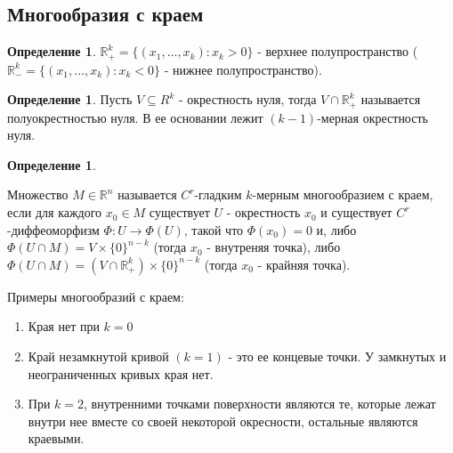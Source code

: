 \documentclass[a5paper]{article}
\newcounter{through}
\theoremstyle{plain}
\theoremstyle{definition}
\newtheorem{definition}[through]{Определение}
\numberwithin{through}{section}
\numberwithin{equation}{section}
\begin{document}
\subsection{Многообразия с краем}

\begin{definition}
	$\mathbb{R}_+^k = \{(x_1, \ldots, x_k) : x_k > 0\}$ - верхнее полупространство ($\mathbb{R}_-^k = \{(x_1, \ldots, x_k) : x_k < 0\}$ - нижнее полупространство).
\end{definition}

\begin{definition}
	Пусть $V \subseteq R^k$ - окрестность нуля, тогда $V \cap \mathbb{R}_+^k$ называется полуокрестностью нуля. В ее основании лежит $(k-1)$-мерная окрестность нуля.
\end{definition}

\begin{definition}
	\label{ManifoldWithBoundary}
	
	Множество $M \in \mathbb{R}^n$ называется $C^r$-гладким $k$-мерным
	многообразием с краем, если для каждого $x_0 \in M$ существует $U$ - окрестность $x_0$ и существует $ C^r$-диффеоморфизм $\Phi : U \to \Phi (U)$, такой что $\Phi(x_0)=0$ и, либо $\Phi(U \cap M) = V \times \{0\}^{n-k}$ (тогда $x_0$ - внутреняя точка), либо 
	$\Phi(U \cap M) = (V \cap \mathbb{R}_+^k ) \times \{0\}^{n-k}$ (тогда 
	$x_0$ - крайняя точка).
	
\end{definition}


Примеры многообразий с краем:

\begin{enumerate}	
	\item
	Края нет при $k = 0$
	
	\item
	Край незамкнутой кривой $(k = 1)$ - это ее концевые точки. У замкнутых и неограниченных кривых края нет.
	\begin{center}
	\end{center}
	\item
	При $k = 2$, внутренними точками поверхности являются те, которые лежат внутри нее вместе со своей некоторой окресности, остальные являются краевыми.
	
	
	
\end{enumerate}
\end{document}
